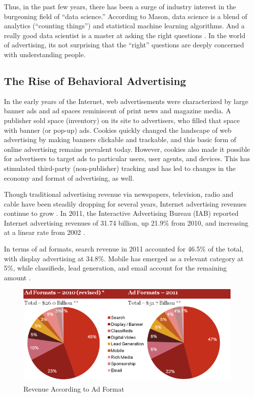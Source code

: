 Thus, in the past few years, there has been a surge of industry interest in the burgeoning field of ``data science.'' According to Mason, data science is a blend of analytics (``counting things'') and statistical machine learning algorithms. And a really good data scientist is a master at asking the right questions  \citep{MachineLearningfor:2012uy}.  In the world of advertising, its not surprising that the ``right'' questions are deeply concerned with understanding people.

\subsection{The Rise of Behavioral Advertising}
\label{theriseofbehavioraladvertising}

In the early years of the Internet, web advertisements were characterized by large banner ads and ad spaces reminiscent of print news and magazine media. A publisher sold space (inventory) on its site to advertisers, who filled that space with banner (or pop-up) ads. Cookies quickly changed the landscape of web advertising by making banners clickable and trackable, and this basic form of online advertising remains prevalent today. However, cookies also made it possible for advertisers to target ads to particular users, user agents, and devices. This has stimulated third-party (non-publisher) tracking and has led to changes in the economy and format of advertising, as well.

Though traditional advertising revenue via newspapers, television, radio and cable have been steadily dropping for several years, Internet advertising revenues continue to grow  \citep{IAB:sv1S8BTo}.  In 2011, the Interactive Advertising Bureau (IAB) reported Internet advertising revenues of 31.74 billion, up 21.9\% from 2010, and increasing at a linear rate from 2002  \citep{IAB:sv1S8BTo}. 

In terms of ad formats, search revenue in 2011 accounted for 46.5\% of the total, with display advertising at 34.8\%. Mobile has emerged as a relevant category at 5\%, while classifieds, lead generation, and email account for the remaining amount  \citep{IAB:sv1S8BTo}. 


\begin{figure}
\centerline{
  \includegraphics{chapter2.tex/Image0}
  }
\caption{Revenue According to Ad Format \citep[Image credit: ][]{IAB:sv1S8BTo}}
\end{figure}

